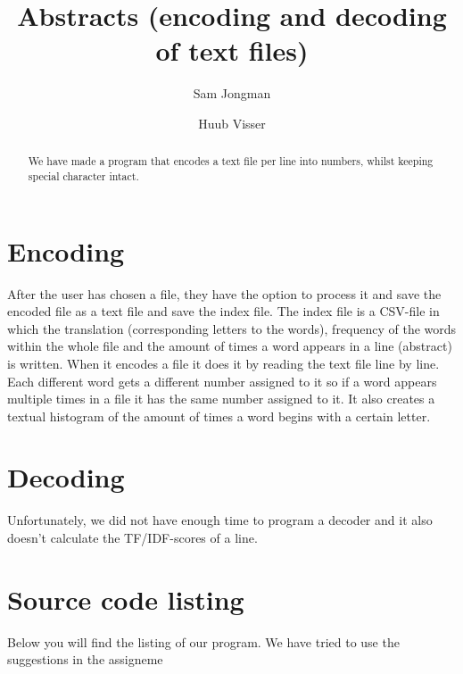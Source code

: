 \documentclass{article}
\begin{document}
\title{Abstracts (encoding and decoding of text files){}}
\author{Sam Jongman}
\author{Huub Visser}

\maketitle

\begin{abstract}
We have made a program that encodes a text file per line into numbers, whilst keeping special character intact. 
\end{abstract}

\section{Encoding}
After the user has chosen a file, they have the option to process it and save the encoded file as a text file and save the index file. The index file is a CSV-file in which the translation (corresponding letters to the words), frequency of the words within the whole file and the amount of times a word appears in a line (abstract) is written. When it encodes a file it does it by reading the text file line by line. Each different word gets a different number assigned to it so if a word appears multiple times in a file it has the same number assigned to it. It also creates a textual histogram of the amount of times a word begins with a certain letter.

\section{Decoding}
Unfortunately, we did not have enough time to program a decoder and it also doesn’t calculate the TF/IDF-scores of a line. 

\section{Source code listing}
Below you will find the listing of our program. We have tried to use the suggestions in the assigneme
\end{document}
